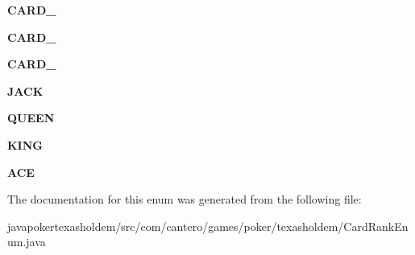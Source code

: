 \begin{DoxyCompactItemize}
\item 
\hypertarget{enumcom_1_1cantero_1_1games_1_1poker_1_1texasholdem_1_1_card_rank_enum_ac6353f471b5baf48d21013e0fd446119}{}{\bfseries C\+A\+R\+D\+\_}\label{enumcom_1_1cantero_1_1games_1_1poker_1_1texasholdem_1_1_card_rank_enum_ac6353f471b5baf48d21013e0fd446119}

\item 
\hypertarget{enumcom_1_1cantero_1_1games_1_1poker_1_1texasholdem_1_1_card_rank_enum_ad65a77402f4be207a4f7a187b61db5b1}{}{\bfseries C\+A\+R\+D\+\_}\label{enumcom_1_1cantero_1_1games_1_1poker_1_1texasholdem_1_1_card_rank_enum_ad65a77402f4be207a4f7a187b61db5b1}

\item 
\hypertarget{enumcom_1_1cantero_1_1games_1_1poker_1_1texasholdem_1_1_card_rank_enum_a2b76ad4131ba908825159413322d11df}{}{\bfseries C\+A\+R\+D\+\_}\label{enumcom_1_1cantero_1_1games_1_1poker_1_1texasholdem_1_1_card_rank_enum_a2b76ad4131ba908825159413322d11df}

\item 
\hypertarget{enumcom_1_1cantero_1_1games_1_1poker_1_1texasholdem_1_1_card_rank_enum_a679b516dec336b6fb6183c20bb8e8777}{}{\bfseries J\+A\+C\+K}\label{enumcom_1_1cantero_1_1games_1_1poker_1_1texasholdem_1_1_card_rank_enum_a679b516dec336b6fb6183c20bb8e8777}

\item 
\hypertarget{enumcom_1_1cantero_1_1games_1_1poker_1_1texasholdem_1_1_card_rank_enum_aa41efbe777c51ba99aaefd99a3731db5}{}{\bfseries Q\+U\+E\+E\+N}\label{enumcom_1_1cantero_1_1games_1_1poker_1_1texasholdem_1_1_card_rank_enum_aa41efbe777c51ba99aaefd99a3731db5}

\item 
\hypertarget{enumcom_1_1cantero_1_1games_1_1poker_1_1texasholdem_1_1_card_rank_enum_af330e6570919d0c33b52f591d5e39ac9}{}{\bfseries K\+I\+N\+G}\label{enumcom_1_1cantero_1_1games_1_1poker_1_1texasholdem_1_1_card_rank_enum_af330e6570919d0c33b52f591d5e39ac9}

\item 
\hypertarget{enumcom_1_1cantero_1_1games_1_1poker_1_1texasholdem_1_1_card_rank_enum_af68cecd5f9ce116a6da136236efa1d6f}{}{\bfseries A\+C\+E}\label{enumcom_1_1cantero_1_1games_1_1poker_1_1texasholdem_1_1_card_rank_enum_af68cecd5f9ce116a6da136236efa1d6f}

\end{DoxyCompactItemize}


The documentation for this enum was generated from the following file\+:\begin{DoxyCompactItemize}
\item 
javapokertexasholdem/src/com/cantero/games/poker/texasholdem/Card\+Rank\+Enum.\+java\end{DoxyCompactItemize}
